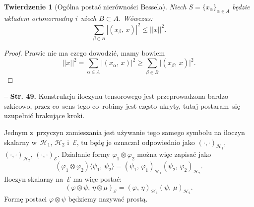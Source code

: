 \documentclass[a4paper,11pt]{article}
\newtheorem{twr}{Twierdzenie}
\newcommand{\mc}{\mathcal}
\newcommand{\al}{\alpha}
\newcommand{\be}{\beta}
\newcommand{\vp}{\varphi}
\newcommand{\Hc}{\mc{H}}
\newcommand{\sset}{\subset}
\newcommand{\ot}{\otimes}
\newcommand{\Sum}{\sum\limits}
\newcommand{\lket}{\langle}
\newcommand{\rket}{\rangle}
\providecommand{\absj}[1]{\lvert #1 \rvert}
\providecommand{\absd}[1]{\left| #1 \right|}
\providecommand{\absd}[1]{\left| \, #1 \, \right|}
\newcommand{\norm}[1]{\left|\left| #1 \right|\right|}
\newcommand{\tb}{\textbf}
\newcommand{\noi}{\noindent}
\newcommand{\start}{\noi \tb{--} {}}
\newcommand{\Str}[1]{\tb{Str. #1.}}
\newcommand{\SP}[2]{( #1, \, #2 )} %
\newcommand{\dket}[2]{\lket #1, \, #2 \rket} %
\begin{document}
\begin{twr}[Ogólna postać nierówności Bessela]
  Niech $S = \{ x_{ \al } \}_{ \al \in A }$ będzie układem
  ortonormalny i~niech $B \sset A$. Wówczas:
  \begin{equation*}
    \Sum_{ \be \in B } \absd{ \SP{ x_{ \be }}{ x } }^{ 2 } \leq \norm{ x }^{ 2 }.
  \end{equation*}
\end{twr}
\begin{proof}
  Prawie nie ma czego dowodzić, mamy bowiem
  \begin{equation*}
    \norm{ x }^{ 2 } = \Sum_{ \al \in A } \absd{ \SP{ x_{ \al } }{ x } }^{ 2 }
    \geq \Sum_{ \be \in B } \absj{ \SP{ x_{ \be }}{ x } }^{ 2 }.
  \end{equation*}
\end{proof}


\start \Str{49} Konstrukcja iloczynu tensorowego jest przeprowadzona
bardzo szkicowo, przez co~sens tego co~robimy jest często ukryty,
tutaj postaram~się uzupełnić brakujące kroki.

Jednym z~przyczyn zamieszania jest używanie tego samego symbolu na
iloczyn skalarny w~$\Hc_{ 1 }$, $\Hc_{ 2 }$ i~$\mc{E}$, tu będę je
oznaczał odpowiednio jako $( \cdot, \cdot )_{ \Hc_{ 1 } }$,
$( \cdot, \cdot )_{ \Hc_{ 2 } }$, $( \cdot, \cdot )_{ \mc{ E } }$.
Działanie formy $\vp_{ 1 } \ot \vp_{ 2 }$ można więc zapisać jako
\begin{equation*}
  ( \vp_{ 1 } \ot \vp_{ 2 } )\dket{ \psi_{ 1 }}{ \psi_{ 2 } }
  = \SP{ \psi_{ 1 } }{ \vp_{ 1 } }_{ \Hc_{ 1 } } \SP{ \psi_{ 2 } }
  { \vp_{ 2 } }_{ \Hc_{ 2 } }.
\end{equation*}
Iloczyn skalarny na~$\mc{E}$ ma więc postać:
\begin{equation*}
  \SP{ \vp \ot \psi }{ \eta \ot \mu }_{ \mc{E} }
  = \SP{ \vp }{ \eta }_{ \Hc_{ 1 } } \SP{ \psi }{ \mu }_{ \Hc_{ 2 } }.
\end{equation*}
Formę postaci $\vp \ot \psi$ będziemy nazywać prostą.
\end{document}

